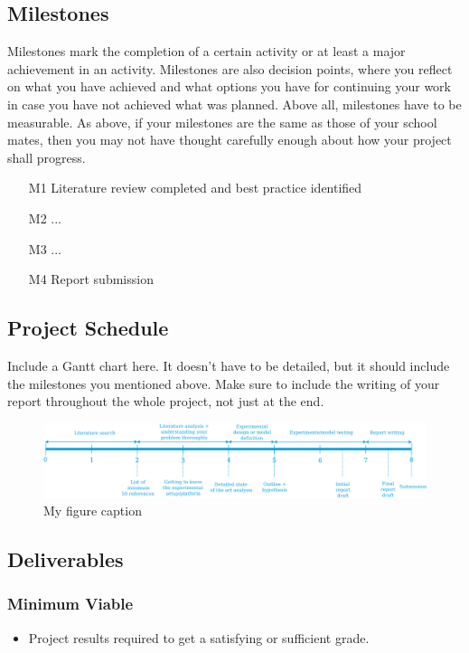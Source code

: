 \documentclass[thesis]{mas_proposal}
\begin{document}
\subsection{Milestones}
Milestones mark the completion of a certain activity or at least a major achievement in an activity. Milestones are also decision points, where you reflect on what you have achieved and what options you have for continuing your work in case you have not achieved what was planned. Above all, milestones have to be measurable. As above, if your milestones are the same as those of your school mates, then you may not have thought carefully enough about how your project shall progress.
\begin{enumerate}
    \item[M1] Literature review completed and best practice identified
    \item[M2] ...
    \item[M3] ...
    \item[M4] Report submission
\end{enumerate}

\subsection{Project Schedule}
Include a Gantt chart here. It doesn't have to be detailed, but it should include the milestones you mentioned above.
Make sure to include the writing of your report throughout the whole project, not just at the end.

\begin{figure}[h!]
    \includegraphics[width=\textwidth]{images/rnd_deliverable_timeline}
    \caption{My figure caption}
    \label{fig:myfigure}
\end{figure}

\subsection{Deliverables}

\subsubsection*{Minimum Viable}
\begin{itemize}
    \item Project results required to get a satisfying or sufficient grade.
\end{itemize}
\end{document}
